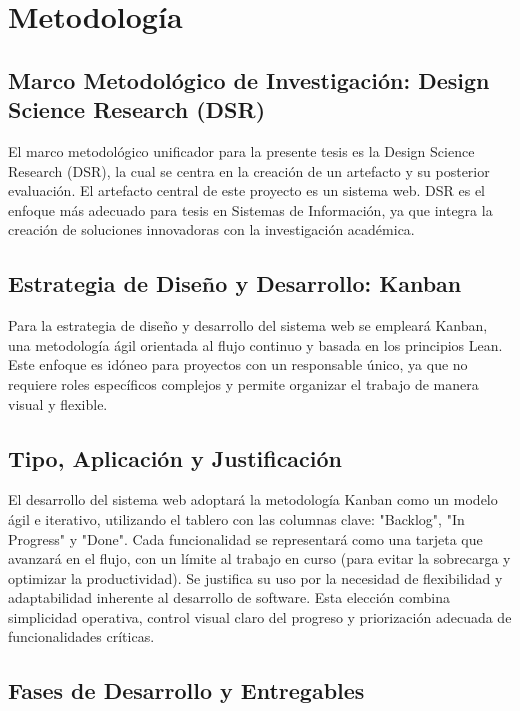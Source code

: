 \section{Metodología}
    
    \subsection{Marco Metodológico de Investigación: Design Science Research (DSR)}
    
    El marco metodológico unificador para la presente tesis es la Design Science Research (DSR), la cual se centra en la creación de un artefacto y su posterior evaluación. El artefacto central de este proyecto es un sistema web. DSR es el enfoque más adecuado para tesis en Sistemas de Información, ya que integra la creación de soluciones innovadoras con la investigación académica.
    
    \subsection{Estrategia de Diseño y Desarrollo: Kanban}
    
    Para la estrategia de diseño y desarrollo del sistema web se empleará Kanban, una metodología ágil orientada al flujo continuo y basada en los principios Lean. Este enfoque es idóneo para proyectos con un responsable único, ya que no requiere roles específicos complejos y permite organizar el trabajo de manera visual y flexible.
    
    \subsection{Tipo, Aplicación y Justificación}
    
    El desarrollo del sistema web adoptará la metodología Kanban como un modelo ágil e iterativo, utilizando el tablero con las columnas clave: "Backlog", "In Progress" y "Done". Cada funcionalidad se representará como una tarjeta que avanzará en el flujo, con un límite al trabajo en curso (para evitar la sobrecarga y optimizar la productividad). Se justifica su uso por la necesidad de flexibilidad y adaptabilidad inherente al desarrollo de software. Esta elección combina simplicidad operativa, control visual claro del progreso y priorización adecuada de funcionalidades críticas.
    
    \subsection{Fases de Desarrollo y Entregables}
    

